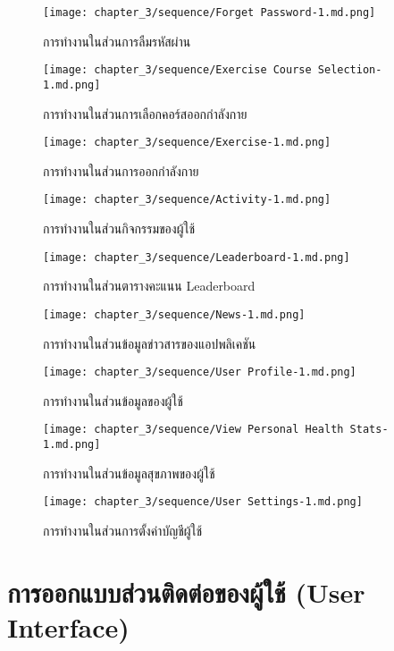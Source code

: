 \begin{figure}
    \texttt{[image: chapter\_3/sequence/Forget Password-1.md.png]}
    \caption{การทำงานในส่วนการลืมรหัสผ่าน}
\end{figure}

\begin{figure}
    \texttt{[image: chapter\_3/sequence/Exercise Course Selection-1.md.png]}
    \caption{การทำงานในส่วนการเลือกคอร์สออกกำลังกาย}
\end{figure}

\begin{figure}
    \texttt{[image: chapter\_3/sequence/Exercise-1.md.png]}
    \caption{การทำงานในส่วนการออกกำลังกาย}
\end{figure}

\begin{figure}
    \texttt{[image: chapter\_3/sequence/Activity-1.md.png]}
    \caption{การทำงานในส่วนกิจกรรมของผู้ใช้}
\end{figure}

\begin{figure}
    \texttt{[image: chapter\_3/sequence/Leaderboard-1.md.png]}
    \caption{การทำงานในส่วนตารางคะแนน Leaderboard}
\end{figure}

\begin{figure}
    \texttt{[image: chapter\_3/sequence/News-1.md.png]}
    \caption{การทำงานในส่วนข้อมูลข่าวสารของแอปพลิเคชัน}
\end{figure}

\begin{figure}
    \texttt{[image: chapter\_3/sequence/User Profile-1.md.png]}
    \caption{การทำงานในส่วนข้อมูลของผู้ใช้}
\end{figure}

\begin{figure}
    \texttt{[image: chapter\_3/sequence/View Personal Health Stats-1.md.png]}
    \caption{การทำงานในส่วนข้อมูลสุขภาพของผู้ใช้}
\end{figure}

\begin{figure}
    \texttt{[image: chapter\_3/sequence/User Settings-1.md.png]}
    \caption{การทำงานในส่วนการตั้งค่าบัญชีผู้ใช้}
\end{figure}

\clearpage

\section{การออกแบบส่วนติดต่อของผู้ใช้ (User Interface)}

